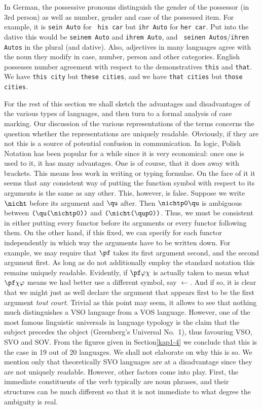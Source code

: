 In German, the possessive pronouns distinguish the gender of the
possessor (in 3rd person) as well as number, gender and case of
the possessed item. For example, it is {\tt sein Auto} for {\tt
his car} but {\tt ihr Auto} for {\tt her car}. Put into the dative
this would be {\tt seinem Auto} and {\tt ihrem Auto}, and {\tt
seinen Autos}/{\tt ihren Autos} in the plural (and dative). Also,
adjectives in many languages agree with the noun they modify in
case, number, person and other categories. English possesses
number agreement with respect to the demonstratives {\tt this} and
{\tt that}. We have {\tt this city} but {\tt these cities}, and we
have {\tt that cities} but {\tt those cities}.

For the rest of this section we shall sketch the advantages and
disadvantages of the various types of languages, and then turn to
a formal analysis of case marking. Our discussion of the various
representations of the terms concerns the question whether the
representations are uniquely readable. Obviously, if they are not
this is a source of potential confusion in communication. In
logic, Polish Notation has been popular for a while since it is
very economical: once one is used to it, it has many advantages.
One is of course, that it does away with brackets. This means less
work in writing or typing formulae. On the face of it it seems
that any consistent way of putting the function symbol with
respect to its arguments is the same as any other. This, however,
is false. Suppose we write $\nicht$ before its argument and $\qu$
after. Then $\nicht \mbox{\tt p0}\qu$ is ambiguous between
$\mbox{\tt (}\qu\mbox{\tt (}\nicht \mbox{\tt p0))}$ and $\mbox{\tt
(}\nicht\mbox{\tt (}\qu\mbox{\tt p0))}$. Thus, we must be
consistent in either putting every functor before its arguments or
every functor following them. On the other hand, if this fixed, we
can specify for each functor independently in which way the
arguments have to be written down. For example, we may require
that $\pf$ takes its first argument second, and the second
argument first. As long as do not additionally employ the standard
notation this remains uniquely readable. Evidently, if
$\pf\varphi\chi$ is actually taken to mean what $\pf\chi\varphi$
means we had better use a different symbol, say $\leftarrow$. And
if so, it is clear that we might just as well declare the argument
that appears first to be the first argument {\it tout court}.
Trivial as this point may seem, it allows to see that nothing much
distinguishes a VSO language from a VOS language. However, one of
the most famous linguistic universals in language typology is the
claim that the subject precedes the object (Greenberg's Universal
No.~1), thus favouring VSO, SVO and SOV. From the figures given in
Section\ref{kap1-4} we conclude that this is the case in 19 out of
20 languages. We shall not elaborate on why this is so. We mention
only that theoretically SVO languages are at a disadvantage since
they are not uniquely readable. However, other factors come into
play. First, the immediate constituents of the verb typically are
noun phrases, and their structures can be much different so that
it is not immediate to what degree the ambiguity is real.
